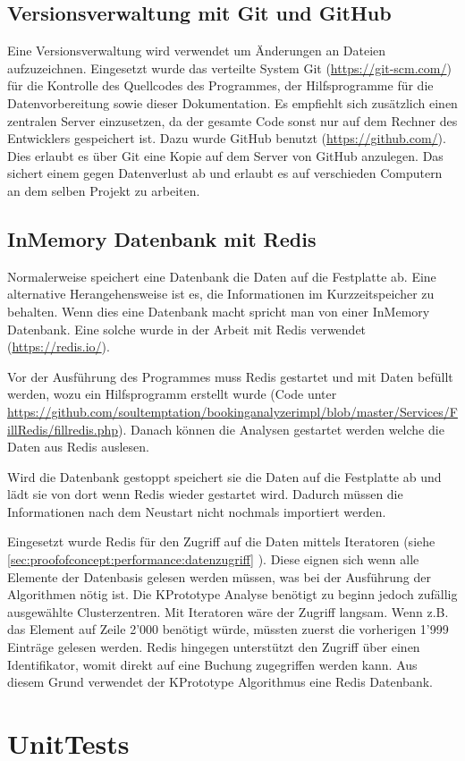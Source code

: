 \subsection{Versionsverwaltung mit Git und GitHub}
Eine Versionsverwaltung wird verwendet um Änderungen an Dateien aufzuzeichnen. Eingesetzt wurde das verteilte System Git (\url{https://git-scm.com/}) für die Kontrolle des Quellcodes des Programmes, der Hilfsprogramme für die Datenvorbereitung sowie dieser Dokumentation. Es empfiehlt sich zusätzlich einen zentralen Server einzusetzen, da der gesamte Code sonst nur auf dem Rechner des Entwicklers gespeichert ist. Dazu wurde GitHub benutzt (\url{https://github.com/}). Dies erlaubt es über Git eine Kopie auf dem Server von GitHub anzulegen. Das sichert einem gegen Datenverlust ab und erlaubt es auf verschieden Computern an dem selben Projekt zu arbeiten.

\subsection{InMemory Datenbank mit Redis}
\label{sec:proofofconcept:externebibliotheken:redis}
Normalerweise speichert eine Datenbank die Daten auf die Festplatte ab. Eine alternative Herangehensweise ist es, die Informationen im Kurzzeitspeicher zu behalten. Wenn dies eine Datenbank macht spricht man von einer InMemory Datenbank. Eine solche wurde in der Arbeit mit Redis verwendet (\url{https://redis.io/}).

Vor der Ausführung des Programmes muss Redis gestartet und mit Daten befüllt werden, wozu ein Hilfsprogramm erstellt wurde (Code unter \url{https://github.com/soultemptation/bookinganalyzerimpl/blob/master/Services/FillRedis/fillredis.php}). Danach können die Analysen gestartet werden welche die Daten aus Redis auslesen. 

Wird die Datenbank gestoppt speichert sie die Daten auf die Festplatte ab und lädt  sie von dort wenn Redis wieder gestartet wird. Dadurch müssen die Informationen nach dem Neustart nicht nochmals importiert werden.

Eingesetzt wurde Redis für den Zugriff auf die Daten mittels Iteratoren (siehe \cref{sec:proofofconcept:performance:datenzugriff} ). Diese eignen sich wenn alle Elemente der Datenbasis gelesen werden müssen, was bei der Ausführung der Algorithmen nötig ist. Die KPrototype Analyse benötigt zu beginn jedoch zufällig ausgewählte Clusterzentren. Mit Iteratoren wäre der Zugriff langsam. Wenn z.B. das Element auf Zeile 2'000 benötigt würde, müssten zuerst die vorherigen 1'999 Einträge gelesen werden. Redis hingegen unterstützt den Zugriff über einen Identifikator, womit direkt auf eine Buchung zugegriffen werden kann. Aus diesem Grund verwendet der KPrototype Algorithmus eine Redis Datenbank.


\section{UnitTests}



